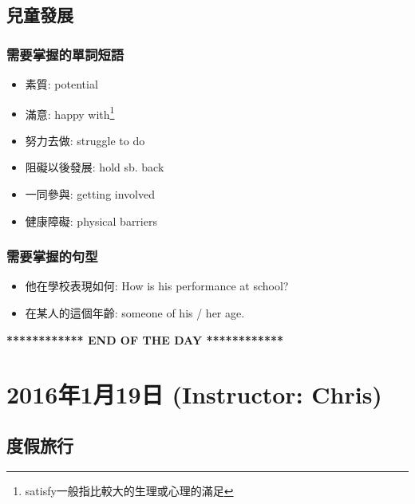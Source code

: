 \subsection{兒童發展}
\subsubsection*{需要掌握的單詞短語}
\begin{multicols}{2}
\begin{itemize}
  \itemsep0em
  \item 素質: potential
  \item 滿意: happy with\footnote{satisfy一般指比較大的生理或心理的滿足}
  \item 努力去做: struggle to do
  \item 阻礙以後發展: hold sb. back
  \item 一同參與: getting involved
  \item 健康障礙: physical barriers
\end{itemize}
\end{multicols}

\subsubsection*{需要掌握的句型}
\begin{itemize}
  \itemsep0em
  \item 他在學校表現如何: How is his performance at school?
  \item 在某人的這個年齡: someone of his / her age.
\end{itemize}

\vspace{15mm}

\begin{center}
  \textbf{************ END OF THE DAY ************}
\end{center}

\newpage

\section{2016年1月19日 (Instructor: Chris)}
\subsection{度假旅行}
